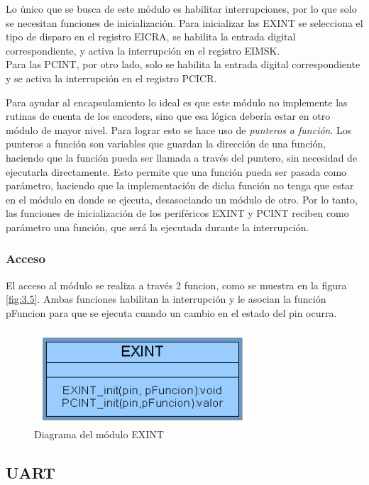 Lo único que se busca de este módulo es habilitar interrupciones, por lo que solo se necesitan funciones de inicialización.
Para inicializar las EXINT se selecciona el tipo de disparo en el registro EICRA, se habilita la entrada digital correspondiente, y activa la interrupción en el registro EIMSK.\\
Para las PCINT, por otro lado, solo se habilita la entrada digital correspondiente y se activa la interrupción en el registro PCICR.

Para ayudar al encapsulamiento lo ideal es que este módulo no implemente las rutinas de cuenta de los encoders, sino que esa lógica debería estar en otro módulo de mayor nivel. Para lograr esto se hace uso de \textit{punteros a función}. Los punteros a función son variables que guardan la dirección de una función, haciendo que la función pueda ser llamada a través del puntero, sin necesidad de ejecutarla directamente.
Esto permite que una función pueda ser pasada como parámetro, haciendo que la implementación de dicha función no tenga que estar en el módulo en donde se ejecuta, desasociando un módulo de otro. Por lo tanto, las funciones de inicialización de los periféricos EXINT y PCINT reciben como parámetro una función, que será la ejecutada durante la interrupción.

\subsubsection{Acceso}
El acceso al módulo se realiza a través 2 funcion, como se muestra en la figura \ref{fig:3.5}. Ambas funciones habilitan la interrupción y le asocian la función pFuncion para que se ejecuta cuando un cambio en el estado del pin ocurra.

\begin{figure}[!ht]
	\centering
	\includegraphics[width=8cm,scale=1]{resources/3_5-moduloEXINT.png}
	\caption{Diagrama del módulo EXINT}
	\label{fig:\thefigure}
\end{figure}


\subsection{UART}
